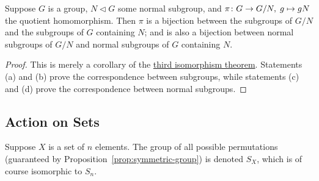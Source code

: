 \begin{theorem}\label{thm:iso-4-group}
    Suppose \(G\) is a group,
    \(N \lhd G\) some normal subgroup,
    and \(\pi\colon G\to G/N,\;g\mapsto gN\) the quotient homomorphism.
    Then \(\pi\) is a bijection
    between the subgroups of \(G/N\)
    and the subgroups of \(G\) containing \(N\);
    and is also a bijection between normal subgroups of \(G/N\)
    and normal subgroups of \(G\) containing \(N\).
\end{theorem}
\begin{proof}
    This is merely a corollary of
    the \hyperref[thm:iso-3-group]{third isomorphism theorem}.
    Statements (a) and (b) prove the correspondence between subgroups,
    while statements (c) and (d)
    prove the correspondence between normal subgroups.


\end{proof}


\subsection{Action on Sets}

\begin{definition}
    Suppose \(X\) is a set of \(n\) elements.
    The group of all possible permutations
    (guaranteed by Proposition~\ref{prop:symmetric-group})
    is denoted \(S_X\),
    which is of course isomorphic to \(S_n\).
\end{definition}

